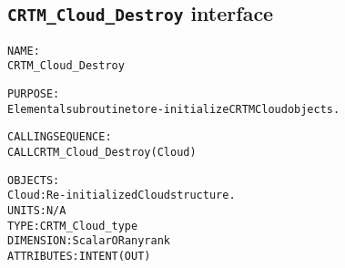 \subsection{\texttt{CRTM\_Cloud\_Destroy} interface}
  \label{sec:CRTM_Cloud_Destroy_interface}
  \begin{alltt}
 
  NAME:
        CRTM_Cloud_Destroy
  
  PURPOSE:
        Elemental subroutine to re-initialize CRTM Cloud objects.
 
  CALLING SEQUENCE:
        CALL CRTM_Cloud_Destroy( Cloud )
 
  OBJECTS:
        Cloud:        Re-initialized Cloud structure.
                      UNITS:      N/A
                      TYPE:       CRTM_Cloud_type
                      DIMENSION:  Scalar OR any rank
                      ATTRIBUTES: INTENT(OUT)
 
  \end{alltt}
